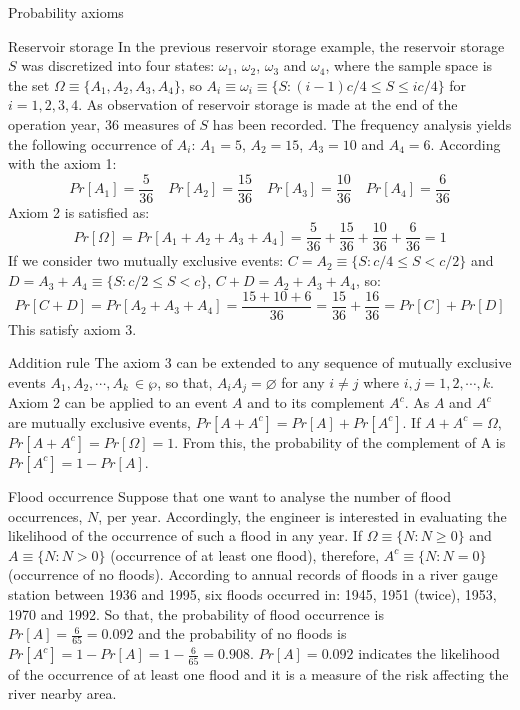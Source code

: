 \documentclass[8pt]{beamer}
\renewcommand{\emph}[1]{\textcolor{myorange}{#1}}
\begin{document}
\begin{frame}{Probability axioms}
    \begin{exampleblock}{Reservoir storage}
        In the previous reservoir storage example, the reservoir storage $S$ was discretized into four states: $\omega_1$, $\omega_2$, $\omega_3$ and $\omega_4$, where the sample space is the set $\Omega \equiv \{A_1, A_2, A_3, A_4 \}$, so $A_i \equiv \omega_i \equiv \{ S: (i-1)c/4 \leq S \leq ic/4 \}$ for $i = 1, 2, 3, 4$. As observation of reservoir storage is made at the end of the operation year, 36 measures of $S$ has been recorded. The frequency analysis yields the following occurrence of $A_i$: $A_1 = 5$, $A_2 = 15$, $A_3 = 10$ and $A_4 = 6$. According with the \alert{axiom 1}:
        $$
        Pr[A_1] = \frac{5}{36} \quad Pr[A_2] = \frac{15}{36} \quad Pr[A_3] = \frac{10}{36} \quad Pr[A_4] = \frac{6}{36} 
        $$
        \alert{Axiom 2} is satisfied as:
        $$
        Pr[\Omega] = Pr[ A_1 + A_2 + A_3 + A_4 ] = \frac{5}{36} + \frac{15}{36} + \frac{10}{36} + \frac{6}{36} = 1
        $$
        If we consider two mutually exclusive events: $C = A_2 \equiv \{ S: c/4 \leq S < c/2 \}$ and $D = A_3 + A_4 \equiv \{ S: c/2 \leq S < c \}$, $C + D = A_2 + A_3 + A_4$, so:
        $$
        Pr[C + D] = Pr[ A_2 + A_3 + A_4 ] = \frac{15 + 10 + 6}{36} = \frac{15}{36} + \frac{16}{36} = Pr[C] + Pr[D]
        $$
        This satisfy \alert{axiom 3}. 
    \end{exampleblock}
\end{frame}

\begin{frame}{Addition rule}
    The \emph{axiom 3 } can be extended to any sequence of mutually exclusive events $A_1, A_2, \cdots, A_k \, \in \wp$, so that, $A_i A_j = \varnothing$ for any $i \neq j$ where $i,j = 1, 2, \cdots, k$. \emph{Axiom 2} can be applied to an event $A$ and to its complement $A^c$. As $A$ and $A^c$ are mutually exclusive events, $Pr[A + A^c] = Pr[A] + Pr[A^c] $. If $A + A^c = \Omega$, $Pr[A + A^c] = Pr[\Omega] = 1$. From this, the \emph{probability of the complement of A} is $Pr[A^c] = 1 - Pr[A]$.
    \begin{exampleblock}{Flood occurrence}
        Suppose that one want to analyse the number of flood occurrences, $N$,  per year. Accordingly, the engineer is interested in evaluating the likelihood of the occurrence of such a flood in any year. If $\Omega \equiv \{ N : N \geq 0 \}$ and $A \equiv \{ N : N > 0 \}$ (occurrence of at least one flood), therefore, $A^c \equiv \{ N : N = 0 \}$ (occurrence of no floods). According to annual records of floods in a river gauge station between 1936 and 1995, six floods occurred in: 1945, 1951 (twice), 1953, 1970 and 1992. So that, the probability of flood occurrence is $Pr[A] = \frac{6}{65} = 0.092$ and the probability of no floods is $Pr[A^c ] = 1 - Pr[A] = 1 - \frac{6}{65} = 0.908$. $Pr[A] = 0.092$ indicates the likelihood of the occurrence of at least one flood and it is a measure of the risk affecting the river nearby area. 
    \end{exampleblock}
\end{frame}
\end{document}

